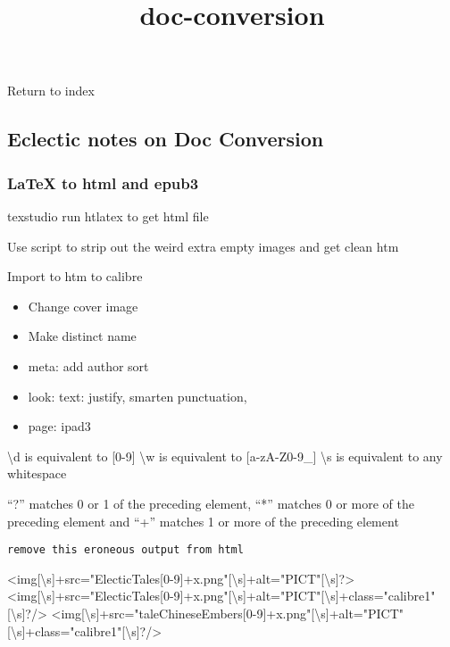 \documentclass[
]{article}
\title{doc-conversion}
\author{}
\date{}
\providecommand{\tightlist}{%
  \setlength{\itemsep}{0pt}\setlength{\parskip}{0pt}}
\begin{document}
\maketitle

Return to index

\subsection{Eclectic notes on Doc Conversion}

\subsubsection{LaTeX to html and epub3}

texstudio run htlatex to get html file

Use script to strip out the weird extra empty images and get clean htm

Import to htm to calibre

\begin{itemize}
\tightlist
\item
  Change cover image
\item
  Make distinct name
\item
  meta: add author sort
\item
  look: text: justify, smarten punctuation,
\item
  page: ipad3
\end{itemize}

\textbackslash d is equivalent to {[}0-9{]} \textbackslash w is
equivalent to {[}a-zA-Z0-9\_{]} \textbackslash s is equivalent to any
whitespace

``?'' matches 0 or 1 of the preceding element, ``*'' matches 0 or more
of the preceding element and ``+'' matches 1 or more of the preceding
element

\begin{verbatim}
remove this eroneous output from html

\end{verbatim}

\textless img{[}\textbackslash s{]}+src="ElecticTales{[}0-9{]}+x.png"{[}\textbackslash s{]}+alt="PICT"{[}\textbackslash s{]}?\textgreater{}
\textless img{[}\textbackslash s{]}+src="ElecticTales{[}0-9{]}+x.png"{[}\textbackslash s{]}+alt="PICT"{[}\textbackslash s{]}+class="calibre1"{[}\textbackslash s{]}?/\textgreater{}
\textless img{[}\textbackslash s{]}+src="taleChineseEmbers{[}0-9{]}+x.png"{[}\textbackslash s{]}+alt="PICT"{[}\textbackslash s{]}+class="calibre1"{[}\textbackslash s{]}?/\textgreater{}
\end{document}
